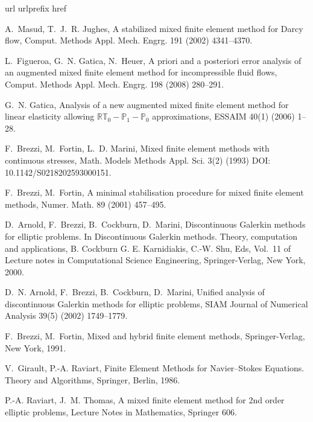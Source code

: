 \documentclass[3p]{elsarticle}
\begin{document}
\begin{thebibliography}{10}
\expandafter\ifx\csname url\endcsname\relax
  \def\url#1{\texttt{#1}}\fi
\expandafter\ifx\csname urlprefix\endcsname\relax\def\urlprefix{URL }\fi
\expandafter\ifx\csname href\endcsname\relax
  \def\href#1#2{#2} \def\path#1{#1}\fi

A.~Masud, T.~J.~R. Jughes, A stabilized mixed finite element method for {D}arcy
  flow, Comput. Methods Appl. Mech. Engrg. 191 (2002) 4341--4370.

L.~Figueroa, G.~N. Gatica, N.~Heuer, A priori and a posteriori error analysis
  of an augmented mixed finite element method for incompressible fluid flows,
  Comput. Methods Appl. Mech. Engrg. 198 (2008) 280--291.

G.~N. Gatica, Analysis of a new augmented mixed finite element method for
  linear elasticity allowing $\mathbb{RT}_{0}-\mathbb{P}_{1}-\mathbb{P}_{0}$
  approximations, ESSAIM 40(1) (2006) 1--28.

F.~Brezzi, M.~Fortin, L.~D. Marini, Mixed finite element methods with
  continuous stresses, Math. Models Methods Appl. Sci. 3(2) (1993) DOI:
  10.1142/S0218202593000151.

F.~Brezzi, M.~Fortin, A minimal stabilisation procedure for mixed finite
  element methods, Numer. Math. 89 (2001) 457--495.

D.~Arnold, F.~Brezzi, B.~Cockburn, D.~Marini, Discontinuous {G}alerkin methods
  for elliptic problems. In Discontinuous {G}alerkin methods. Theory,
  computation and applications, B. Cockburn G. E. Karnidiakis, C.-W. Shu, Eds,
  Vol.~11 of Lecture notes in Computational Science Engineering,
  Springer-Verlag, New York, 2000.

D.~N. Arnold, F.~Brezzi, B.~Cockburn, D.~Marini, Unified analysis of
  discontinuous {G}alerkin methods for elliptic problems, SIAM Journal of
  Numerical Analysis 39(5) (2002) 1749--1779.

F.~Brezzi, M.~Fortin, Mixed and hybrid finite element methods, Springer-Verlag,
  New York, 1991.

V.~Girault, P.-A. Raviart, Finite Element Methods for {N}avier--{S}tokes
  Equations. Theory and Algorithms, Springer, Berlin, 1986.

P.-A. Raviart, J.~M. Thomas, A mixed finite element method for 2nd order
  elliptic problems, Lecture Notes in Mathematics, Springer 606.


\end{thebibliography}
\end{document}
